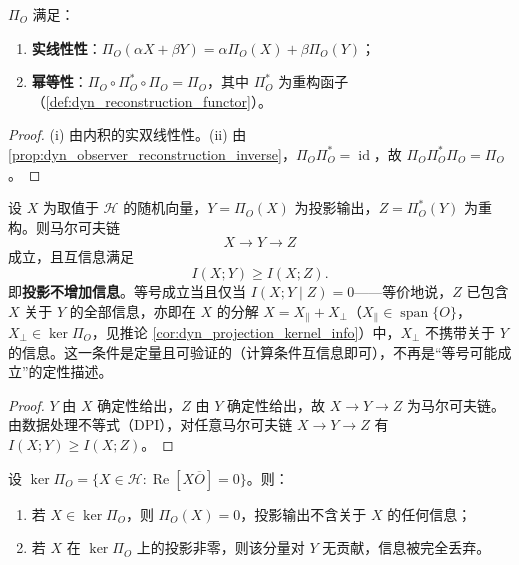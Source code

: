 \begin{proposition}[投影是幂等的线性算子]\label{prop:dyn_projection_idempotent}
$\Pi_O$ 满足：
\begin{enumerate}[label=(\roman*)]
    \item \textbf{实线性性}：$\Pi_O(\alpha X+\beta Y)=\alpha\Pi_O(X)+\beta\Pi_O(Y)$；
    \item \textbf{幂等性}：$\Pi_O\circ\Pi_O^\ast\circ\Pi_O=\Pi_O$，其中 $\Pi_O^\ast$ 为重构函子（\cref{def:dyn_reconstruction_functor}）。
\end{enumerate}
\end{proposition}

\begin{proof}
(i) 由内积的实双线性性。(ii) 由 \cref{prop:dyn_observer_reconstruction_inverse}，$\Pi_O\Pi_O^\ast=\operatorname{id}$，故 $\Pi_O\Pi_O^\ast\Pi_O=\Pi_O$。
\end{proof}

\begin{theorem}\label{thm:dyn_projection_dpi}
设 $X$ 为取值于 $\mathcal H$ 的随机向量，$Y=\Pi_O(X)$ 为投影输出，$Z=\Pi_O^\ast(Y)$ 为重构。则马尔可夫链
\[
X\longrightarrow Y\longrightarrow Z
\]
成立，且互信息满足
\[
I(X;Y)\ge I(X;Z).
\]
即\textbf{投影不增加信息}。等号成立当且仅当 $I(X;Y\mid Z)=0$——等价地说，$Z$ 已包含 $X$ 关于 $Y$ 的全部信息，亦即在 $X$ 的分解 $X=X_\parallel+X_\perp$（$X_\parallel\in\operatorname{span}\{O\}$，$X_\perp\in\ker\Pi_O$，见推论 \ref{cor:dyn_projection_kernel_info}）中，$X_\perp$ 不携带关于 $Y$ 的信息。这一条件是定量且可验证的（计算条件互信息即可），不再是“等号可能成立”的定性描述。
\end{theorem}

\begin{proof}
$Y$ 由 $X$ 确定性给出，$Z$ 由 $Y$ 确定性给出，故 $X\to Y\to Z$ 为马尔可夫链。由数据处理不等式（DPI），对任意马尔可夫链 $X\to Y\to Z$ 有 $I(X;Y)\ge I(X;Z)$。
\end{proof}

\begin{corollary}[不可观测子空间与信息损失]\label{cor:dyn_projection_kernel_info}
设 $\ker\Pi_O=\{X\in\mathcal H:\operatorname{Re}[X\overline O]=0\}$。则：
\begin{enumerate}[label=(\roman*)]
    \item 若 $X\in\ker\Pi_O$，则 $\Pi_O(X)=0$，投影输出不含关于 $X$ 的任何信息；
    \item 若 $X$ 在 $\ker\Pi_O$ 上的投影非零，则该分量对 $Y$ 无贡献，信息被完全丢弃。
\end{enumerate}
\end{corollary}

